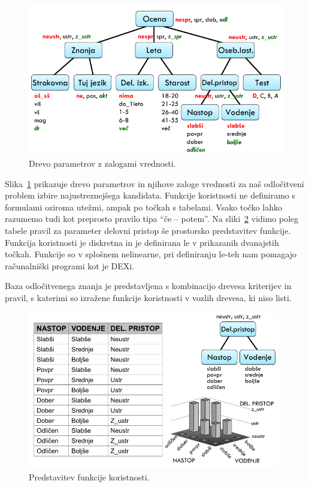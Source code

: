 \begin{figure}[htbp]
\begin{center}
\includegraphics[width=12cm]{slike/drevo-parametrov.pdf}
\caption{Drevo parametrov z zalogami vrednosti.}
\label{f-drevo-parametrov}
\end{center}
\end{figure}
 
Slika~\ref{f-drevo-parametrov} prikazuje drevo parametrov in njihove zaloge vrednosti za naš odločitveni problem izbire najustreznejšega kandidata. Funkcije koristnosti ne definiramo s formulami oziroma utežmi, ampak po točkah s tabelami. Vsako točko lahko razumemo tudi kot preprosto pravilo tipa ``če – potem''. Na sliki~\ref{f-predstavitef-f} vidimo poleg tabele pravil za parameter delovni pristop še prostorsko predstavitev funkcije. Funkcija koristnosti je diskretna in je definirana le v prikazanih dvanajstih točkah. Funkcije so v splošnem nelinearne, pri definiranju  le-teh nam pomagajo računalniški programi kot je DEXi.

Baza odločitvenega znanja je predstavljena s kombinacijo drevesa kriterijev in pravil, s katerimi so izražene funkcije koristnosti v vozlih drevesa, ki niso listi.

\begin{figure}[htbp]
\begin{center}
\includegraphics[width=11cm]{slike/predstavitev-f.pdf}
\caption{Predstavitev funkcije koristnosti.}
\label{f-predstavitef-f}
\end{center}
\end{figure}

